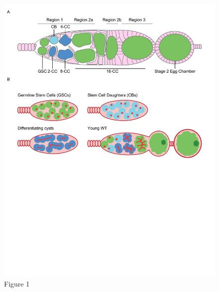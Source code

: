 \documentclass[
]{article}
\author{}
\date{\vspace{-2.5em}}
\begin{document}
\begin{figure}
\centering
\includegraphics{Figure1.pdf}
\caption{Figure 1}
\end{figure}
\end{document}
